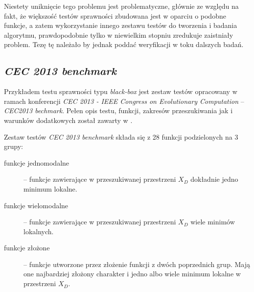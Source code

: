 \documentclass[12pt,a4paper]{report}
\begin{document}
{{{{{{{\begin{description}
\par{
Niestety uniknięcie tego problemu jest problematyczne, głównie ze względu na fakt, że większość testów sprawności zbudowana jest w oparciu o podobne funkcje, a zatem wykorzystanie innego zestawu testów do tworzenia i badania algorytmu, prawdopodobnie tylko w niewielkim stopniu zredukuje zaistniały problem. Tezę tę należało by jednak poddać weryfikacji w toku dalszych badań.
} 
\end{description}
}
\subsection{\emph{CEC 2013 benchmark}}
\label{CEC2013chapter}
\par{
Przykładem testu sprawności typu \emph{black-box} jest zestaw testów opracowany w ramach konferencji \emph{CEC 2013 - IEEE Congress on Evolutionary Computation} -- \emph{CEC2013 bechmark}. Pełen opis testu, funkcji, zakresów przeszukiwania jak i warunków dodatkowych został zawarty w \cite{Li13benchmarkfunctions}.
}
\par{
Zestaw testów \emph{CEC 2013 benchmark} składa się z 28 funkcji podzielonych na 3 grupy:
\begin{description}
\item[funkcje jednomodalne] -- funkcje zawierające w przeszukiwanej przestrzeni $X_D$ dokładnie jedno minimum lokalne.
\item[funkcje wielomodalne] -- funkcje zawierające w przeszukiwanej przestrzeni $X_D$ wiele minimów lokalnych.
\item[funkcje złożone] -- funkcje utworzone przez złożenie funkcji z dwóch poprzednich grup. Mają one najbardziej złożony charakter i jedno albo wiele minimum lokalne w przestrzeni $X_D$.
\end{description}

}}}}}}}
\end{document}
